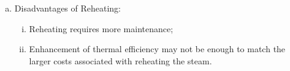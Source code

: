 \documentclass[10pt,compress]{beamer}
\begin{document}
\begin{frame}
\begin{columns}
\begin{column}[c]{0.5\linewidth}
{\begin{figure}
\begin{center}
           \end{center}
        \end{figure}} 
        \begin{enumerate}[(a)]\scriptsize\setcounter{enumi}{5}
           \item<5-> Disadvantages of Reheating:
              \begin{enumerate}[(i)]\scriptsize
                 \item<5->Reheating requires more maintenance;
                 \item<5->Enhancement of thermal efficiency may not be enough to match the larger costs associated with reheating the steam.
              \end{enumerate}
        \end{enumerate}
     \end{column}
  \end{columns}
 \normalsize
\end{frame}
\end{document}
